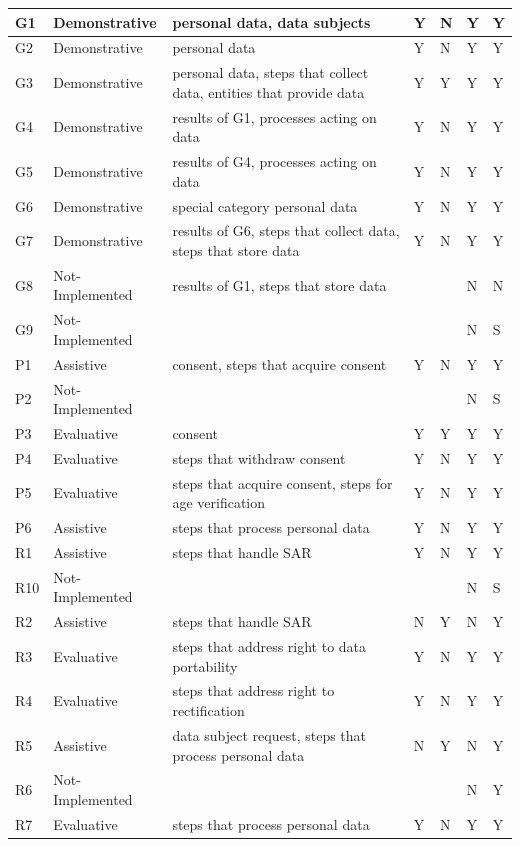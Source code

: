 \begin{center}
\begin{tabularx}{\textwidth}{|l|l|X|l|l|l|l|}
G1 & Demonstrative & personal data, data subjects & Y & N & Y & Y \\ \hline
G2 & Demonstrative & personal data & Y & N & Y & Y \\ \hline
G3 & Demonstrative & personal data, steps that collect data, entities that provide data & Y & Y & Y & Y \\ \hline
G4 & Demonstrative & results of G1, processes acting on data & Y & N & Y & Y \\ \hline
G5 & Demonstrative & results of G4, processes acting on data & Y & N & Y & Y \\ \hline
G6 & Demonstrative & special category personal data & Y & N & Y & Y \\ \hline
G7 & Demonstrative & results of G6, steps that collect data, steps that store data & Y & N & Y & Y \\ \hline
G8 & Not-Implemented & results of G1, steps that store data &  &  & N & N \\ \hline
G9 & Not-Implemented &  &  &  & N & S \\ \hline
P1 & Assistive & consent, steps that acquire consent & Y & N & Y & Y \\ \hline
P2 & Not-Implemented &  &  &  & N & S \\ \hline
P3 & Evaluative & consent & Y & Y & Y & Y \\ \hline
P4 & Evaluative & steps that withdraw consent & Y & N & Y & Y \\ \hline
P5 & Evaluative & steps that acquire consent, steps for age verification & Y & N & Y & Y \\ \hline
P6 & Assistive & steps that process personal data & Y & N & Y & Y \\ \hline
R1 & Assistive & steps that handle SAR & Y & N & Y & Y \\ \hline
R10 & Not-Implemented &  &  &  & N & S \\ \hline
R2 & Assistive & steps that handle SAR & N & Y & N & Y \\ \hline
R3 & Evaluative & steps that address right to data portability & Y & N & Y & Y \\ \hline
R4 & Evaluative & steps that address right to rectification & Y & N & Y & Y \\ \hline
R5 & Assistive & data subject request, steps that process personal data & N & Y & N & Y \\ \hline
R6 & Not-Implemented &  &  &  & N & Y \\ \hline
R7 & Evaluative & steps that process personal data & Y & N & Y & Y \\ \hline

\end{tabularx}
\end{center}
